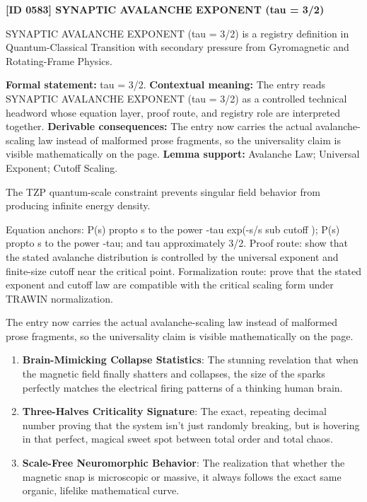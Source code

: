 \clearpage
\noindent\textbf{[ID 0583] SYNAPTIC AVALANCHE EXPONENT (tau = 3/2)}\par
\vspace{0.35em}
\begingroup\small
{}
SYNAPTIC AVALANCHE EXPONENT (tau = 3/2) is a registry definition in Quantum-Classical Transition with secondary pressure from Gyromagnetic and Rotating-Frame Physics.

\begingroup\footnotesize\setlength{\emergencystretch}{3em}\sloppy
\textbf{Formal statement:} tau = 3/2. \textbf{Contextual meaning:} The entry reads SYNAPTIC AVALANCHE EXPONENT (tau = 3/2) as a controlled technical headword whose equation layer, proof route, and registry role are interpreted together. \textbf{Derivable consequences:} The entry now carries the actual avalanche-scaling law instead of malformed prose fragments, so the universality claim is visible mathematically on the page. \textbf{Lemma support:} Avalanche Law; Universal Exponent; Cutoff Scaling.\par
\endgroup

The TZP quantum-scale constraint prevents singular field behavior from producing infinite energy density.

Equation anchors: P(s) propto s to the power -tau exp(-s/s sub cutoff ); P(s) propto s to the power -tau; and tau approximately 3/2. Proof route: show that the stated avalanche distribution is controlled by the universal exponent and finite-size cutoff near the critical point. Formalization route: prove that the stated exponent and cutoff law are compatible with the critical scaling form under TRAWIN normalization.

The entry now carries the actual avalanche-scaling law instead of malformed prose fragments, so the universality claim is visible mathematically on the page.
\endgroup

\begin{enumerate}[leftmargin=1.6em,itemsep=6pt,topsep=4pt]
\item \textbf{Brain-Mimicking Collapse Statistics}: The stunning revelation that when the magnetic field finally shatters and collapses, the size of the sparks perfectly matches the electrical firing patterns of a thinking human brain.
\item \textbf{Three-Halves Criticality Signature}: The exact, repeating decimal number proving that the system isn't just randomly breaking, but is hovering in that perfect, magical sweet spot between total order and total chaos.
\item \textbf{Scale-Free Neuromorphic Behavior}: The realization that whether the magnetic snap is microscopic or massive, it always follows the exact same organic, lifelike mathematical curve.
\end{enumerate}

